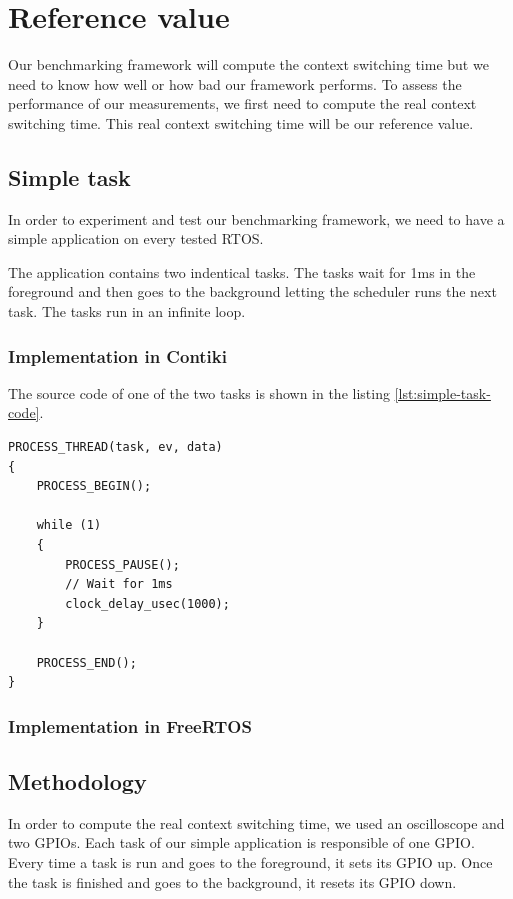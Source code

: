 \section{Reference value}

Our benchmarking framework will compute the context switching time but we need to know how well or how bad our framework performs.
To assess the performance of our measurements, we first need to compute the real context switching time.
This real context switching time will be our reference value.

\subsection{Simple task}
In order to experiment and test our benchmarking framework, we need to have a simple application on every tested RTOS.

The application contains two indentical tasks.
The tasks wait for 1ms in the foreground and then goes to the background letting the scheduler runs the next task.
The tasks run in an infinite loop.

\subsubsection{Implementation in Contiki}
The source code of one of the two tasks is shown in the listing \ref{lst:simple-task-code}.

\begin{lstlisting}[style=CStyle, float, label={lst:simple-task-code}, caption={Source code of a task implemented in Contiki for the simple application}]
PROCESS_THREAD(task, ev, data)
{
    PROCESS_BEGIN();

    while (1)
    {
        PROCESS_PAUSE();
        // Wait for 1ms
        clock_delay_usec(1000);
    }

    PROCESS_END();
}
\end{lstlisting}

\subsubsection{Implementation in FreeRTOS}


\subsection{Methodology}

In order to compute the real context switching time, we used an oscilloscope and two GPIOs.
Each task of our simple application is responsible of one GPIO.
Every time a task is run and goes to the foreground, it sets its GPIO up.
Once the task is finished and goes to the background, it resets its GPIO down.

